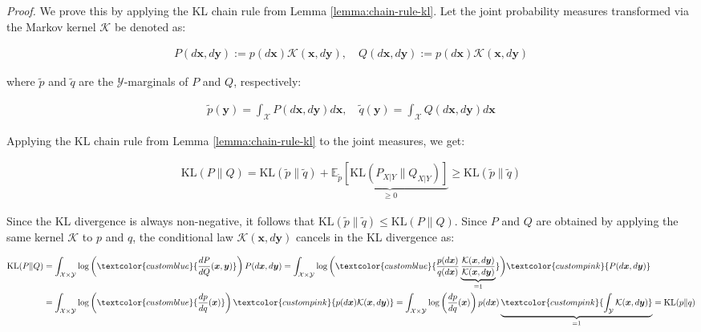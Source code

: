\documentclass{article}
\newcommand{\bluetext}[1]{\textcolor{customblue}{#1}}
\newcommand{\pinktext}[1]{\textcolor{custompink}{#1}}
\begin{document}
\textit{Proof.} We prove this by applying the KL chain rule from Lemma \ref{lemma:chain-rule-kl}. Let the joint probability measures transformed via the Markov kernel $\mathcal{K}$ be denoted as:
\begin{small}
\begin{align}
    P(d\boldsymbol{x},d\boldsymbol{y}):=p(d\boldsymbol{x})\mathcal{K}(\boldsymbol{x},d\boldsymbol{y}), \quad Q(d\boldsymbol{x},d\boldsymbol{y}):=p(d\boldsymbol{x})\mathcal{K}(\boldsymbol{x},d\boldsymbol{y}) 
\end{align}
\end{small}
where $\tilde{p}$ and $\tilde{q}$ are the $\mathcal{Y}$-marginals of $P$ and $Q$, respectively:
\begin{small}
\begin{align}
    \tilde{p}(\boldsymbol{y})=\int_{\mathcal{X}} P(d\boldsymbol{x},d\boldsymbol{y})d\boldsymbol{x},\quad  \tilde{q}(\boldsymbol{y})=\int_{\mathcal{X}} Q(d\boldsymbol{x},d\boldsymbol{y})d\boldsymbol{x}
\end{align}
\end{small}
Applying the KL chain rule from Lemma \ref{lemma:chain-rule-kl} to the joint measures, we get:
\begin{small}
\begin{align}
    \text{KL}(P\|Q)=\text{KL}(\tilde{p}\|\tilde{q})+\underbrace{\mathbb{E}_{\tilde{p}}[\text{KL}(P_{X|Y}\|Q_{X|Y})]}_{\geq 0}\geq \text{KL}(\tilde{p}\|\tilde{q})\label{eq:data-process-proof1}
\end{align}
\end{small}
Since the KL divergence is always non-negative, it follows that $\text{KL}(\tilde{p}\|\tilde{q})\leq \text{KL}(P\|Q)$. Since $P$ and $Q$ are obtained by applying the same kernel $\mathcal{K}$ to $p$ and $q$, the conditional law $\mathcal{K}(\boldsymbol{x},d\boldsymbol{y})$ cancels in the KL divergence as:
\begin{small}
\begin{align}
    \text{KL}(P\|Q)&=\int_{\mathcal{X}\times \mathcal{Y}}\log \left(\bluetext{\frac{dP}{dQ}(\boldsymbol{x},\boldsymbol{y})}\right)P(d\boldsymbol{x},d\boldsymbol{y})=\int_{\mathcal{X}\times \mathcal{Y}}\log \bigg(\bluetext{\frac{p(d\boldsymbol{x})}{q(d\boldsymbol{x})}\underbrace{\frac{\mathcal{K}(\boldsymbol{x},d\boldsymbol{y})}{\mathcal{K}(\boldsymbol{x},d\boldsymbol{y})}}_{=1}}\bigg)\pinktext{P(d\boldsymbol{x},d\boldsymbol{y})}\nonumber\\
    &=\int_{\mathcal{X}\times \mathcal{Y}}\log \left(\bluetext{\frac{dp}{dq}(\boldsymbol{x})}\right)\pinktext{p(d\boldsymbol{x})\mathcal{K}(\boldsymbol{x},d\boldsymbol{y})}=\int_{\mathcal{X}\times \mathcal{Y}}\log \left(\frac{dp}{dq}(\boldsymbol{x})\right)p(d\boldsymbol{x})\underbrace{\pinktext{\int_{ \mathcal{Y}}\mathcal{K}(\boldsymbol{x},d\boldsymbol{y})}}_{=1}=\text{KL}(p\|q)\label{eq:data-process-proof2}
\end{align}
\end{small}
\end{document}
